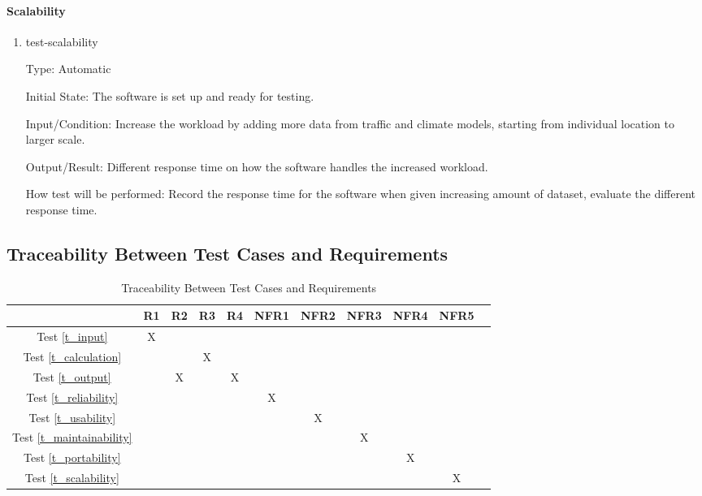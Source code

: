 \documentclass[12pt, titlepage]{article}
\begin{document}
\paragraph{Scalability}

\begin{enumerate}

\item{test-scalability}

Type: Automatic
					
Initial State: The software is set up and ready for testing.
					
Input/Condition: Increase the workload by adding more data from traffic and climate models, starting from individual location to larger scale.
					
Output/Result: Different response time on how the software handles the increased workload.
					
How test will be performed: Record the response time for the software when given increasing amount of dataset, evaluate the different response time.

\end{enumerate}

\subsection{Traceability Between Test Cases and Requirements}

\begin{table}[h]
\centering
\begin{tabular}{|c|c|c|c|c|c|c|c|c|c|c|}
\hline
	& R1 & R2 & R3  & R4 & NFR1 & NFR2 & NFR3 & NFR4 & NFR5 \\
\hline
Test \ref{t_input}        & X & & & & & & & & \\ \hline
Test \ref{t_calculation}        & & & X & & & & & & \\ \hline
Test \ref{t_output}        & & X & & X & & & & & \\ \hline
Test \ref{t_reliability}        & & & & & X & & & & \\ \hline
Test \ref{t_usability}        & & & & & & X & & & \\ \hline
Test \ref{t_maintainability}        & & & & & & & X & & \\ \hline
Test \ref{t_portability}        & & & & & & & & X & \\ \hline
Test \ref{t_scalability}        & & & & & & & & & X \\ \hline
\end{tabular}
\caption{Traceability Between Test Cases and Requirements}
\label{Table:test_requirements}
\end{table}
\end{document}
